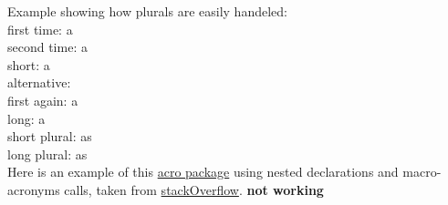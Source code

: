 %

Example showing how plurals are easily handeled:
\\
first time: \ac{a} \\
second time: \ac{a} \\
short: \acs{a} \\
alternative:  \\
first again: \acf{a} \\
long: \acl{a} \\
short plural: \acsp{a} \\
long plural: \aclp{a} \\

Here is an example of this \href{}{acro package}
using nested declarations and macro-acronyms calls, taken from
\href{http://tex.stackexchange.com/questions/135975/how-to-define-an-acronym-by-using-other-acronym-and-print-the-abbreviations-toge}{stackOverflow}.
\textbf{not working}



